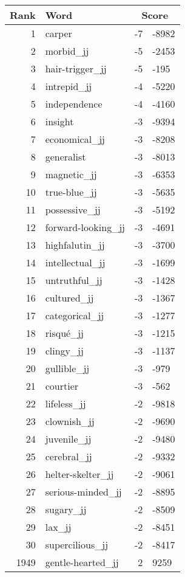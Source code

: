 \begin{longtable}[!htbp]{| rlr@{.}l |}
    \hline
    \textbf{Rank} & \textbf{Word} & \multicolumn{2}{c|}{\textbf{Score}} \\
    \hline
    \endhead
    1 & carper & -7 & -8982 \\
    2 & morbid\_jj & -5 & -2453 \\
    3 & hair-trigger\_jj & -5 & -195 \\
    4 & intrepid\_jj & -4 & -5220 \\
    5 & independence & -4 & -4160 \\
    6 & insight & -3 & -9394 \\
    7 & economical\_jj & -3 & -8208 \\
    8 & generalist & -3 & -8013 \\
    9 & magnetic\_jj & -3 & -6353 \\
    10 & true-blue\_jj & -3 & -5635 \\
    11 & possessive\_jj & -3 & -5192 \\
    12 & forward-looking\_jj & -3 & -4691 \\
    13 & highfalutin\_jj & -3 & -3700 \\
    14 & intellectual\_jj & -3 & -1699 \\
    15 & untruthful\_jj & -3 & -1428 \\
    16 & cultured\_jj & -3 & -1367 \\
    17 & categorical\_jj & -3 & -1277 \\
    18 & risqué\_jj & -3 & -1215 \\
    19 & clingy\_jj & -3 & -1137 \\
    20 & gullible\_jj & -3 & -979 \\
    21 & courtier & -3 & -562 \\
    22 & lifeless\_jj & -2 & -9818 \\
    23 & clownish\_jj & -2 & -9690 \\
    24 & juvenile\_jj & -2 & -9480 \\
    25 & cerebral\_jj & -2 & -9332 \\
    26 & helter-skelter\_jj & -2 & -9061 \\
    27 & serious-minded\_jj & -2 & -8895 \\
    28 & sugary\_jj & -2 & -8509 \\
    29 & lax\_jj & -2 & -8451 \\
    30 & supercilious\_jj & -2 & -8417 \\
    1949 & gentle-hearted\_jj & 2 & 9259 \\

\end{longtable}
